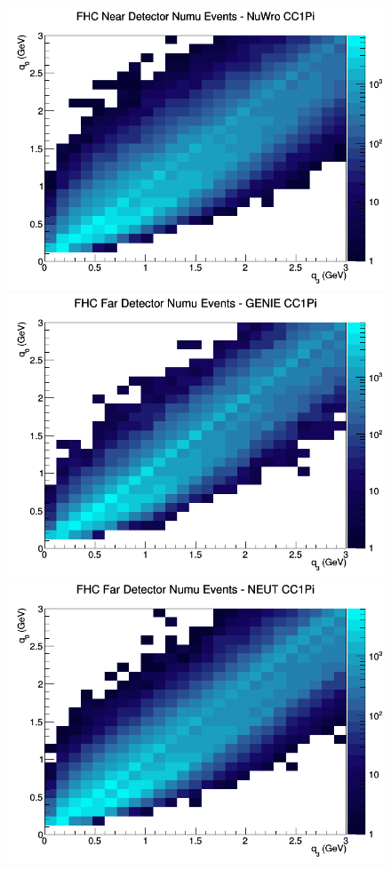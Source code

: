 \documentclass[12pt]{article}
\begin{document}
\begin{figure}[h]
\includegraphics[width=\linewidth]{eff_q0_q3/LAr/CC1Pi_FHC_ND_numu_q3_q0_NuWro.png}
\endminipage
\newline
{}
\includegraphics[width=\linewidth]{eff_q0_q3/LAr/CC1Pi_FHC_FD_numu_q3_q0_GENIE.png}
\endminipage
{}
\includegraphics[width=\linewidth]{eff_q0_q3/LAr/CC1Pi_FHC_FD_numu_q3_q0_NEUT.png}

\end{figure}
\end{document}
